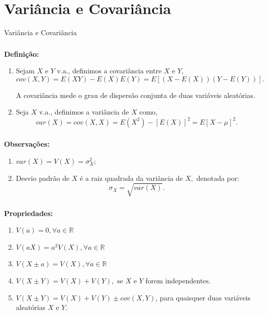 \documentclass[14pt,aspectratio=1610]{beamer}
\begin{document}
\section{Variância e Covariância}
\begin{frame}{Variância e Covariância}
\frametitle{}
\begin{block}{}
\justifying
\textbf{Definição:} 
\begin{enumerate}
\item Sejam $X$ e $Y$ v.a., definimos a covariância entre $X$ e $Y,$ $$cov(X,Y)=E(XY)-E(X)E(Y)=E[(X-E(X))(Y-E(Y))].$$

A covariância mede o grau de dispersão conjunta de duas variáveis aleatórias.\pause

\item Seja $X$ v.a., definimos a variância de $X$ como, $$var(X)=cov(X,X)=E(X^{2})-[E(X)]^{2}=E[X-\mu]^{2}.$$

\end{enumerate}

\end{block}
\end{frame}

\begin{frame}{}
\frametitle{}
\begin{block}{}
\justifying
\textbf{Observações:} 
\begin{enumerate}
\item $var(X)=V(X)=\sigma_{X}^{2};$\pause

\item Desvio padrão de $X$ é a raiz quadrada da variância de $X,$ denotada por: $$\sigma_{X}=\sqrt{var(X)}.$$

\end{enumerate}

\end{block}
\end{frame}

\begin{frame}{}
\frametitle{}
\begin{block}{}
\justifying
\textbf{Propriedades:}

\begin{enumerate}
\item $V(a)=0,\forall a\in \mathbb{R}$\pause
\item $V(aX)=a^{2}V(X),\forall a\in \mathbb{R}$\pause
\item $V(X\pm a)=V(X), \forall a\in \mathbb{R}$\pause
\item $V(X\pm Y)=V(X) + V(Y),$ se $X$ e $Y$ forem independentes.\pause
\item $V(X\pm Y)=V(X) + V(Y) \pm cov(X,Y)$, para quaisquer duas variáveis aleatórias $X$ e $Y.$
\end{enumerate}
\end{block}
\end{frame}
\end{document}
